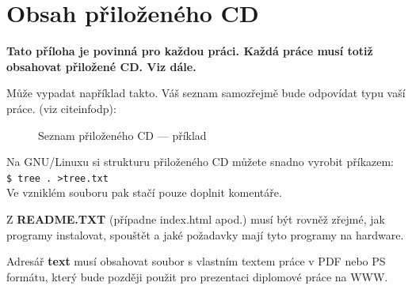 \documentclass[11pt,twoside,a4paper]{book}
\begin{document}
\chapter{Obsah přiloženého CD}
\textbf{\large Tato příloha je povinná pro každou práci. Každá práce musí totiž obsahovat přiložené CD. Viz dále.}

Může vypadat například takto. Váš seznam samozřejmě bude odpovídat typu vaší práce. (viz cite{infodp}):

\begin{figure}[h]
\begin{center}
\caption{Seznam přiloženého CD --- příklad}
\end{center}
\end{figure}

Na GNU/Linuxu si strukturu přiloženého CD můžete snadno vyrobit příkazem:\\ 
\verb|$ tree . >tree.txt|\\
Ve vzniklém souboru pak stačí pouze doplnit komentáře.

Z \textbf{README.TXT} (případne index.html apod.)  musí být rovněž zřejmé, jak programy instalovat, spouštět a jaké požadavky mají tyto programy na hardware.

Adresář \textbf{text}  musí obsahovat soubor s vlastním textem práce v PDF nebo PS formátu, který bude později použit pro prezentaci diplomové práce na WWW.
\end{document}
